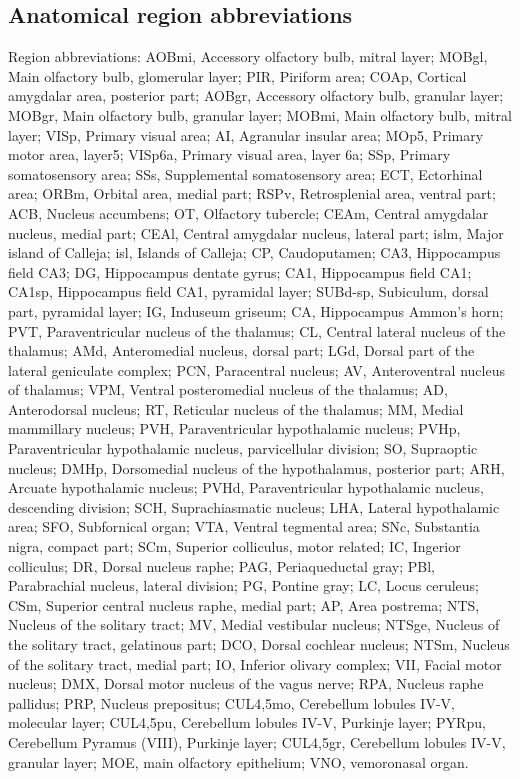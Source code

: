 \subsection{Anatomical region abbreviations}
Region abbreviations: AOBmi, Accessory olfactory bulb, mitral layer; MOBgl, Main olfactory bulb, glomerular layer; PIR, Piriform area; COAp, Cortical amygdalar area, posterior part; AOBgr, Accessory olfactory bulb, granular layer; MOBgr, Main olfactory bulb, granular layer; MOBmi, Main olfactory bulb, mitral layer; VISp, Primary visual area; AI, Agranular insular area; MOp5, Primary motor area, layer5; VISp6a, Primary visual area, layer 6a; SSp, Primary somatosensory area; SSs, Supplemental somatosensory area; ECT, Ectorhinal area; ORBm, Orbital area, medial part; RSPv, Retrosplenial area, ventral part; ACB, Nucleus accumbens; OT, Olfactory tubercle; CEAm, Central amygdalar nucleus, medial part; CEAl, Central amygdalar nucleus, lateral part; islm, Major island of Calleja; isl, Islands of Calleja; CP, Caudoputamen; CA3, Hippocampus field CA3; DG, Hippocampus dentate gyrus; CA1, Hippocampus field CA1; CA1sp, Hippocampus field CA1, pyramidal layer; SUBd-sp, Subiculum, dorsal part, pyramidal layer; IG, Induseum griseum; CA, Hippocampus Ammon’s horn; PVT, Paraventricular nucleus of the thalamus; CL, Central lateral nucleus of the thalamus; AMd, Anteromedial nucleus, dorsal part; LGd, Dorsal part of the lateral geniculate complex; PCN, Paracentral nucleus; AV, Anteroventral nucleus of thalamus; VPM, Ventral posteromedial nucleus of the thalamus; AD, Anterodorsal nucleus; RT, Reticular nucleus of the thalamus; MM, Medial mammillary nucleus; PVH, Paraventricular hypothalamic nucleus; PVHp, Paraventricular hypothalamic nucleus, parvicellular division; SO, Supraoptic nucleus; DMHp, Dorsomedial nucleus of the hypothalamus, posterior part; ARH, Arcuate hypothalamic nucleus; PVHd, Paraventricular hypothalamic nucleus, descending division; SCH, Suprachiasmatic nucleus; LHA, Lateral hypothalamic area; SFO, Subfornical organ; VTA, Ventral tegmental area; SNc, Substantia nigra, compact part; SCm, Superior colliculus, motor related; IC, Ingerior colliculus; DR, Dorsal nucleus raphe; PAG, Periaqueductal gray; PBl, Parabrachial nucleus, lateral division; PG, Pontine gray; LC, Locus ceruleus; CSm, Superior central nucleus raphe, medial part; AP, Area postrema; NTS, Nucleus of the solitary tract; MV, Medial vestibular nucleus; NTSge, Nucleus of the solitary tract, gelatinous part; DCO, Dorsal cochlear nucleus; NTSm, Nucleus of the solitary tract, medial part; IO, Inferior olivary complex; VII, Facial motor nucleus; DMX, Dorsal motor nucleus of the vagus nerve; RPA, Nucleus raphe pallidus; PRP, Nucleus prepositus; CUL4,5mo, Cerebellum lobules IV-V, molecular layer; CUL4,5pu, Cerebellum lobules IV-V, Purkinje layer; PYRpu, Cerebellum Pyramus (VIII), Purkinje layer; CUL4,5gr, Cerebellum lobules IV-V, granular layer; MOE, main olfactory epithelium; VNO, vemoronasal organ.








